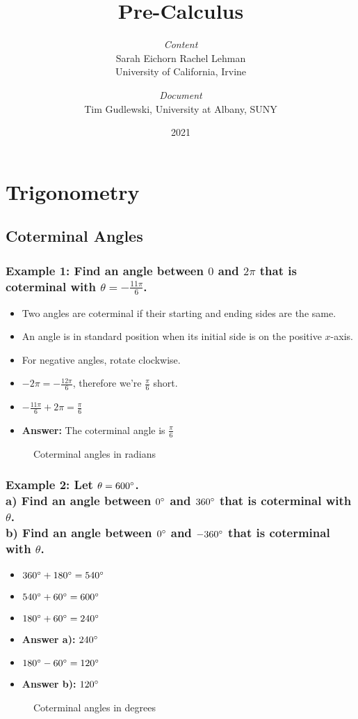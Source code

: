 \documentclass{article}
\title{Pre-Calculus}
\author{\emph{Content}\\Sarah Eichorn \qquad Rachel Lehman\\University of California, Irvine
\and \emph{Document}\\Tim Gudlewski, University at Albany, SUNY}
\date{2021}
\begin{document}
\maketitle
\setcounter{secnumdepth}{2}
\setcounter{tocdepth}{2}
\tableofcontents
\newpage
\section{Trigonometry}
\newpage

\begin{paracol}{2}
\subsection{Coterminal Angles}
\subsubsection{Example 1: Find an angle between $0$ and $2\pi$ that is coterminal with
$\theta = -\frac{11\pi}{6}$.}
\begin{itemize}
  \item Two angles are coterminal if their starting and ending sides are the same.
  \item An angle is in standard position when its initial side is on the positive $x$-axis.
  \item For negative angles, rotate clockwise.
  \item $-2\pi = -\frac{12\pi}{6}$, therefore we're $\frac{\pi}{6}$ short.
  \item $-\frac{11\pi}{6}+2\pi = \frac{\pi}{6}$
  \item \textbf{Answer:} The coterminal angle is $\frac{\pi}{6}$
\end{itemize}
\switchcolumn
\begin{figure}[H]
  \centering
  
  \caption{Coterminal angles in radians}
\end{figure}
\switchcolumn*

\subsubsection{Example 2: Let $\theta = 600\degree$.\\a) Find an angle between $0\degree$ and $360\degree$
that is coterminal with $\theta$.\\b) Find an angle between $0\degree$ and $-360\degree$
that is coterminal with $\theta$.}
\begin{itemize}
  \item $360\degree+180\degree = 540\degree$
  \item $540\degree+60\degree = 600\degree$
  \item $180\degree+60\degree = 240\degree$
  \item \textbf{Answer a):} $240\degree$
  \item $180\degree-60\degree = 120\degree$
  \item \textbf{Answer b):} $120\degree$
\end{itemize}\switchcolumn
\begin{figure}[H]
  \centering
  
  \caption{Coterminal angles in degrees}
\end{figure}
\switchcolumn
\flushpage


\end{paracol}
\end{document}
